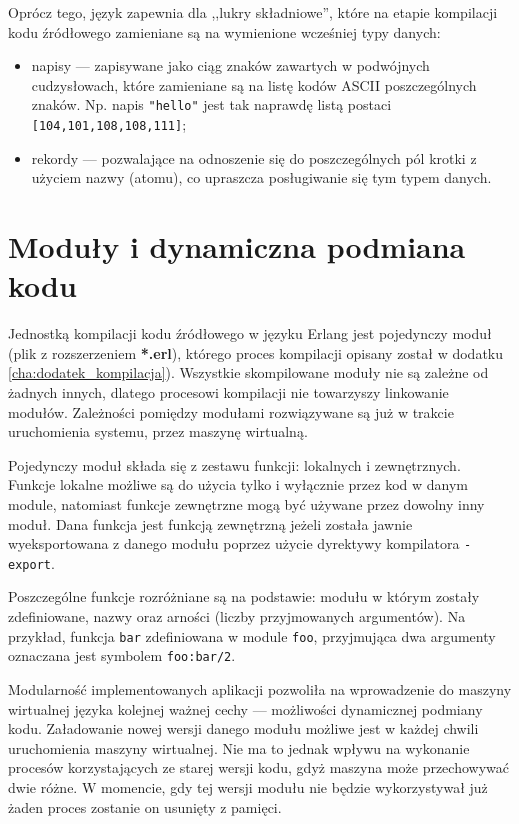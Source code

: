 Oprócz tego, język zapewnia dla ,,lukry składniowe'', które na etapie kompilacji kodu źródłowego zamieniane są na wymienione wcześniej typy danych:
\begin{itemize}
\item napisy --- zapisywane jako ciąg znaków zawartych w podwójnych cudzysłowach, które zamieniane są na listę kodów ASCII poszczególnych znaków. Np. napis \texttt{"hello"} jest tak naprawdę listą postaci \texttt{[104,101,108,108,111]};
\item rekordy --- pozwalające na odnoszenie się do poszczególnych pól krotki z użyciem nazwy (atomu), co upraszcza posługiwanie się tym typem danych.
\end{itemize}

\section{Moduły i dynamiczna podmiana kodu}
\label{sec:erlangModuly}

Jednostką kompilacji kodu źródłowego w języku Erlang jest pojedynczy moduł (plik z rozszerzeniem \textbf{*.erl}), którego proces kompilacji opisany został w dodatku \ref{cha:dodatek_kompilacja}).
Wszystkie skompilowane moduły nie są zależne od żadnych innych, dlatego procesowi kompilacji nie towarzyszy linkowanie modułów.
Zależności pomiędzy modułami rozwiązywane są już w trakcie uruchomienia systemu, przez maszynę wirtualną. 

Pojedynczy moduł składa się z zestawu funkcji: lokalnych i zewnętrznych.
Funkcje lokalne możliwe są do użycia tylko i wyłącznie przez kod w danym module, natomiast funkcje zewnętrzne mogą być używane przez dowolny inny moduł.
Dana funkcja jest funkcją zewnętrzną jeżeli została jawnie wyeksportowana z danego modułu poprzez użycie dyrektywy kompilatora \texttt{-export}.

Poszczególne funkcje rozróżniane są na podstawie: modułu w którym zostały zdefiniowane, nazwy oraz arności (liczby przyjmowanych argumentów).
Na przykład, funkcja \texttt{bar} zdefiniowana w module \texttt{foo}, przyjmująca dwa argumenty oznaczana jest symbolem \texttt{foo:bar/2}.

Modularność implementowanych aplikacji pozwoliła na wprowadzenie do maszyny wirtualnej języka kolejnej ważnej cechy --- możliwości dynamicznej podmiany kodu.
Załadowanie nowej wersji danego modułu możliwe jest w każdej chwili uruchomienia maszyny wirtualnej.
Nie ma to jednak wpływu na wykonanie procesów korzystających ze starej wersji kodu, gdyż maszyna może przechowywać dwie różne.
W momencie, gdy tej wersji modułu nie będzie wykorzystywał już żaden proces zostanie on usunięty z pamięci.


